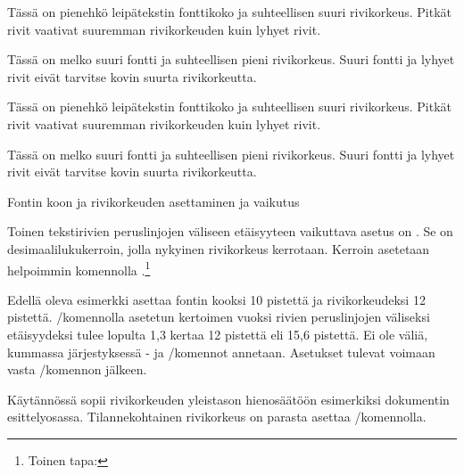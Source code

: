 \begin{esimerkki*}
\begin{koodilohko}
  \fontsize{8bp}{11bp}\selectfont Tässä on pienehkö leipätekstin
  fonttikoko ja suhteellisen suuri rivikorkeus. Pitkät rivit vaativat
  suuremman rivikorkeuden kuin lyhyet rivit.

  \fontsize{16bp}{17bp}\selectfont Tässä on melko suuri fontti ja
  suhteellisen pieni rivikorkeus. Suuri fontti ja lyhyet rivit eivät
  tarvitse kovin suurta rivikorkeutta.
\end{koodilohko}
\parbox{\linewidth}{%
  \linespread{1}\erikoisfontti
  \fontsize{8bp}{11bp}\selectfont Tässä on pienehkö leipätekstin
  fonttikoko ja suhteellisen suuri rivikorkeus. Pitkät rivit vaativat
  suuremman rivikorkeuden kuin lyhyet rivit.

  \fontsize{16bp}{17bp}\selectfont Tässä on melko suuri fontti ja
  suhteellisen pieni rivikorkeus. Suuri fontti ja lyhyet rivit eivät
  tarvitse kovin suurta rivikorkeutta. }

\vspace{1ex}
\hrulefill
\vspace{2ex}

\caption{Fontin koon ja rivikorkeuden asettaminen ja vaikutus}
\label{esim:rivikorkeus}
\end{esimerkki*}

Toinen tekstirivien peruslinjojen väliseen etäisyyteen vaikuttava asetus
on . Se on desimaalilukukerroin, jolla
nykyinen rivikorkeus kerrotaan. Kerroin asetetaan helpoimmin komennolla
.\footnote{Toinen tapa: }

\begin{koodilohkosis}
  \fontsize{10bp}{12bp} \linespread{1.3} \selectfont
\end{koodilohkosis}

Edellä oleva esimerkki asettaa fontin kooksi 10 pistettä ja
rivikorkeudeksi 12 pistettä. \-/komennolla
asetetun kertoimen vuoksi rivien peruslinjojen väliseksi etäisyydeksi
tulee lopulta 1,3 kertaa 12 pistettä eli 15,6 pistettä. Ei ole väliä,
kummassa järjestyksessä - ja \-/komennot annetaan. Asetukset tulevat voimaan vasta
\-/komennon jälkeen.

Käytännössä  sopii rivikorkeuden yleistason
hienosäätöön esimerkiksi dokumentin esittelyosassa. Tilannekohtainen
rivikorkeus on parasta asettaa \-/komennolla.

